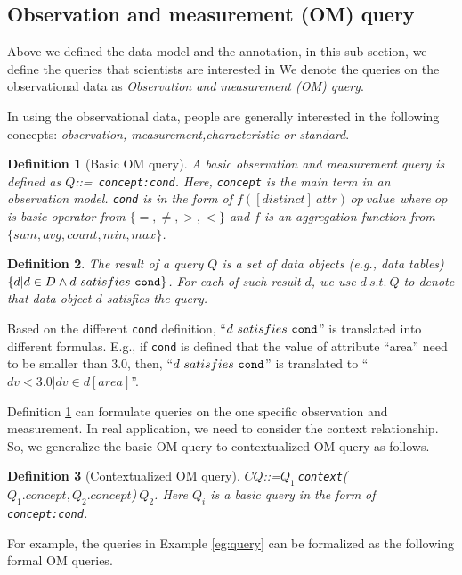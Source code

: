 \documentclass[conference]{IEEEtran}
\newtheorem{definition}{Definition}[section]
\begin{document}
\subsection{Observation and measurement (OM) query}
Above we defined the data model and the annotation, in this
sub-section, we define the queries that scientists are interested in
We denote the queries on the observational data as {\em Observation
and measurement (OM) query}. 

In using the observational data, people are generally interested in
the following concepts: {\em observation, measurement,characteristic or standard}. 

\begin{definition}[Basic OM query]\label{def:basic_omq}
A basic observation and measurement query is defined as $Q$::={\tt
  concept:cond}. 
Here, {\tt concept} is the main term in an observation model. 
{\tt cond} is in the form of $f([distinct]~attr)~op~value$ where $op$ is
basic operator from $\{=, \neq, >, <\}$ and $f$ is an
aggregation function from $\{sum, avg, count, min, max\}$. 
\end{definition}

\begin{definition}\label{def:qresult}
The result of a query $Q$ is a set of data objects (e.g., data tables) 
$\{d|d\in D \wedge d~satisfies~{\tt cond}\}$. 
For each of such result $d$, we use $d~s.t.~Q$ to denote that
data object $d$ satisfies the query. 
\end{definition}

Based on the different {\tt cond} definition, ``$d~satisfies~{\tt cond}$''
is translated into different formulas. 
E.g., if {\tt cond} is defined that the value of attribute ``area'' need to be
smaller than $3.0$, then, ``$d~satisfies~{\tt cond}$'' is translated to
``$dv<3.0|dv\in d[area]$''.
 
Definition \ref{def:basic_omq} can formulate queries on the
one specific observation and measurement. 
In real application, we need to consider the context relationship. 
So, we generalize the basic OM query to contextualized OM query as
follows. 

\begin{definition}[Contextualized OM query]\label{def:context_omq}
$CQ$::=$Q_1~${\tt context}($Q_1.concept, Q_2.concept$)$~Q_2$. Here $Q_i$ is a basic query
in the form of {\tt concept:cond}. 
\end{definition}

For example, the queries in Example \ref{eg:query} can be formalized
as the following formal OM queries. 
\end{document}
